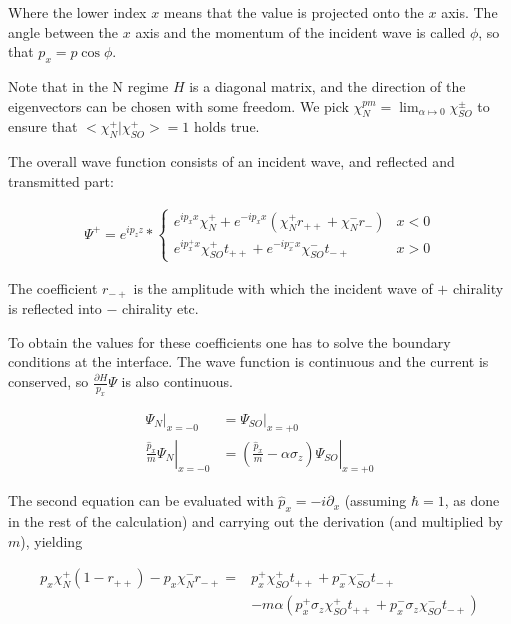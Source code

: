 \documentclass[11pt]{article}
\begin{document}
Where the lower index $x$ means that the value is projected onto the
$x$ axis. The angle between the $x$ axis and the momentum of the
incident wave is called $\phi$, so that $p_x = p \cos \phi$.

Note that in the N regime $H$ is a diagonal matrix, and the direction
of the eigenvectors can be chosen with some freedom. We pick
$\chi_N^{pm} = \lim_{\alpha \mapsto 0} \chi_{SO}^{\pm}$ to ensure that
$<\chi_N^+|\chi_{SO}^+> = 1$ holds true.


The overall wave function consists of an incident wave, 
and reflected and transmitted part:

\begin{align}
    \Psi^+ = e^{i p_z z} * \left\{
        \begin{array}{ll}
            e^{i p_x x} \chi_N^+ + e^{- i p_x x} (\chi_N^+ r_{++} +
                    \chi_N^- r_{-})     & x < 0\\
            e^{i p_x^+ x} \chi_{SO}^+ t_{++} + e^{-i p_x^- x}
            \chi_{SO}^- t_{-+}          & x > 0
        \end{array} \right.
\end{align}

The coefficient $r_{-+}$ is the amplitude with which the incident wave
of $+$ chirality is reflected into $-$ chirality etc.

To obtain the values for these coefficients one has to solve the
boundary conditions at the interface. The wave function is continuous
and the current is conserved, so $\frac{\partial H}{p_x} \Psi$ is also
continuous.

\begin{align}
    \Psi_N|_{x = -0}    &= \Psi_{SO}|_{x = +0}\\
    \left.\frac{\hat p_x}{m} \Psi_N\right|_{x = -0}
                        &= \left. \left(\frac{\hat p_x}{m} -\alpha \sigma_z\right)
                                    \Psi_{SO}\right|_{x = +0}
\end{align}

The second equation can be evaluated with $\hat p_x = -i \partial_x$
(assuming $\hbar = 1$, as done in the rest of the calculation) and
carrying out the derivation (and multiplied by $m$), yielding

\begin{align}
    p_x \chi_N^+ (1 - r_{++}) - p_x \chi_N^- r_{-+}
        =& p_x^+ \chi_{SO}^+ t_{++} + p_x^- \chi_{SO}^- t_{-+} \nonumber\\
         &   - m \alpha \left( p_x^+ \sigma_z \chi_{SO}^+ t_{++} + p_x^-
                     \sigma_z \chi_{SO}^- t_{-+} \right)
\end{align}
\end{document}
